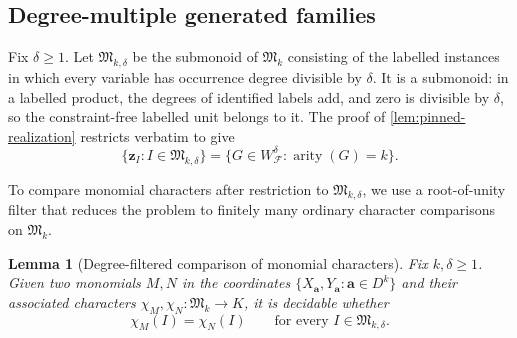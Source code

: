 \documentclass[11pt]{article}
\theoremstyle{plain}
\newtheorem{lemma}[lemma]{Lemma}
\theoremstyle{definition}
\theoremstyle{remark}
\newcommand{\cF}{\mathcal F}
\newcommand{\WFdeg}[1]{W_{\cF}^{#1}}
\newcommand{\zvec}[1]{\mathbf z_{#1}}
\newcommand{\InstMonoid}[1]{\mathfrak M_{#1}}
\DeclareMathOperator{\arity}{arity}
\begin{document}
\subsection{Degree-multiple generated families}
\label{subsec:degree-multiple-identities}

Fix $\delta\ge1$.  Let $\mathfrak M_{k,\delta}$ be the submonoid of
$\InstMonoid{k}$ consisting of the labelled instances in which every
variable has occurrence degree divisible by $\delta$.  It is a submonoid:
in a labelled product, the degrees of identified labels add, and zero is
divisible by $\delta$, so the constraint-free labelled unit belongs to it.
The proof of \cref{lem:pinned-realization} restricts verbatim to give
\begin{equation*}
  \{\zvec I:I\in\mathfrak M_{k,\delta}\}
  =\{G\in\WFdeg{\delta}:\arity(G)=k\}.
\end{equation*}

To compare monomial characters after restriction to
$\mathfrak M_{k,\delta}$, we use a root-of-unity filter that reduces the
problem to finitely many ordinary character comparisons on
$\InstMonoid{k}$.

\begin{lemma}[Degree-filtered comparison of monomial characters]
\label{lem:degree-filtered-character-comparison}
Fix $k,\delta\ge1$.  Given two monomials $M,N$ in the coordinates
$\{X_{\mathbf a},Y_{\mathbf a}:\mathbf a\in D^k\}$ and their associated
characters $\chi_M,\chi_N:\InstMonoid{k}\to K$, it is decidable whether
\begin{equation}
  \chi_M(I)=\chi_N(I)
  \qquad\text{for every }I\in\mathfrak M_{k,\delta}.
  \label{eq:degree-filtered-character-goal}
\end{equation}
\end{lemma}
\end{document}
